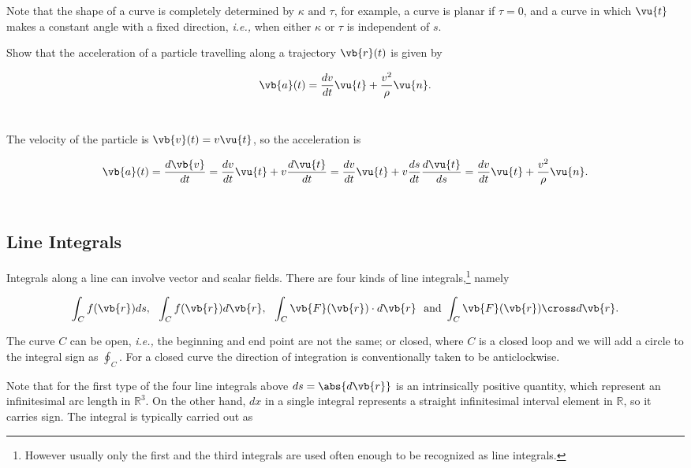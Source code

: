 \documentclass[english,a4paper,12pt]{report}
\begin{document}
Note that the shape of a curve is completely determined by \(\kappa \text { and } \tau \), for example, a curve is planar if \(\tau = 0\), and a curve in which \(\vu{t} \) makes a constant angle with a fixed direction, \textit{i.e.,} when either \(\kappa \text { or } \tau \) is independent of \(s\). 



{Show that the acceleration of a particle travelling along a trajectory \(\vb{r} (t)\) is given by 

\begin{equation}
	\vb{a} (t) = \frac{dv}{dt} \vu{t} + \frac{v^2}{\rho } \vu{n} .  
\end{equation}
~
}
{The velocity of the particle is \(\vb{v} (t) = v \vu{t} \), so the acceleration is 

\begin{equation}
	\vb{a} (t) = \frac{d\vb{v} }{dt} = \frac{dv}{dt} \vu{t} + v \frac{d \vu{t} }{dt} = \frac{dv}{dt}\vu{t} + v \frac{ds}{dt}\frac{d \vu{t} }{ds} = \frac{dv}{dt} \vu{t} + \frac{v^2}{\rho }\vu{n} .       
\end{equation}
~
}

\subsection{Line Integrals}

Integrals along a line can involve vector and scalar fields. There are four kinds of line integrals,\footnote{However usually only the first and the third integrals are used often enough to be recognized as line integrals.}  namely

\begin{equation}
	\int _{C} f(\vb{r} ) ds, ~~ \int_{C}^{} f(\vb{r} ) d\vb{r} , ~~ \int_{C}^{} \vb{F} (\vb{r} ) \cdot d\vb{r} ~ \text { and }  \int_{C}^{} \vb{F} (\vb{r} ) \cross d\vb{r} . 
\end{equation}

The curve \(C\) can be open, \textit{i.e.,} the beginning and end point are not the same; or closed, where \(C\) is a closed loop and we will add a circle to the integral sign as \(\oint_{C} \). For a closed curve the direction of integration is conventionally taken to be anticlockwise.

Note that for the first type of the four line integrals above \(ds = \abs{d \vb{r} } \) is an intrinsically positive quantity, which represent an infinitesimal arc length in \(\mathbb{R}^3 \). On the other hand, \(dx\) in a single integral represents a straight infinitesimal interval element in \(\mathbb{R}\), so it carries sign. The integral is typically carried out as
\end{document}
